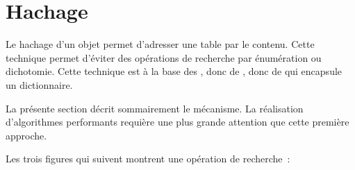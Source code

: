 \section{Hachage}
\label{sec:hash}

Le hachage d'un objet permet d'adresser une table par le contenu.
Cette technique permet d'\'eviter des op\'erations de recherche
par \'enum\'eration ou dichotomie. Cette technique est \`a la base
des , donc de , donc de  qui encapsule un dictionnaire.

La pr\'esente section d\'ecrit sommairement le m\'ecanisme. La r\'ealisation
d'algorithmes performants requi\`ere une plus grande attention que
cette premi\`ere approche.

Les trois figures qui suivent montrent une op\'eration de recherche~:

